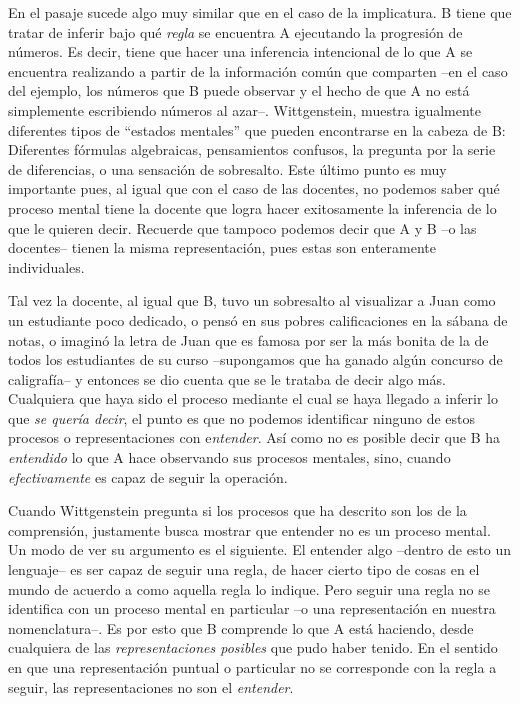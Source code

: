 \documentclass[]{book}
\begin{document}
En el pasaje sucede algo muy similar que en el caso de la implicatura. B
tiene que tratar de inferir bajo qué \emph{regla} se encuentra A
ejecutando la progresión de números. Es decir, tiene que hacer una
inferencia intencional de lo que A se encuentra realizando a partir de
la información común que comparten --en el caso del ejemplo, los números
que B puede observar y el hecho de que A no está simplemente escribiendo
números al azar--. Wittgenstein, muestra igualmente diferentes tipos de
``estados mentales'' que pueden encontrarse en la cabeza de B:
Diferentes fórmulas algebraicas, pensamientos confusos, la pregunta por
la serie de diferencias, o una sensación de sobresalto. Este último
punto es muy importante pues, al igual que con el caso de las docentes,
no podemos saber qué proceso mental tiene la docente que logra hacer
exitosamente la inferencia de lo que le quieren decir. Recuerde que
tampoco podemos decir que A y B --o las docentes-- tienen la misma
representación, pues estas son enteramente individuales.

Tal vez la docente, al igual que B, tuvo un sobresalto al visualizar a
Juan como un estudiante poco dedicado, o pensó en sus pobres
calificaciones en la sábana de notas, o imaginó la letra de Juan que es
famosa por ser la más bonita de la de todos los estudiantes de su curso
--supongamos que ha ganado algún concurso de caligrafía-- y entonces se
dio cuenta que se le trataba de decir algo más. Cualquiera que haya sido
el proceso mediante el cual se haya llegado a inferir lo que \emph{se
quería decir}, el punto es que no podemos identificar ninguno de estos
procesos o representaciones con e\emph{ntender}. Así como no es posible
decir que B ha \emph{entendido} lo que A hace observando sus procesos
mentales, sino, cuando \emph{efectivamente} es capaz de seguir la
operación.

Cuando Wittgenstein pregunta si los procesos que ha descrito son los de
la comprensión, justamente busca mostrar que entender no es un proceso
mental. Un modo de ver su argumento es el siguiente. El entender algo
--dentro de esto un lenguaje-- es ser capaz de seguir una regla, de
hacer cierto tipo de cosas en el mundo de acuerdo a como aquella regla
lo indique. Pero seguir una regla no se identifica con un proceso mental
en particular --o una representación en nuestra nomenclatura--. Es por
esto que B comprende lo que A está haciendo, desde cualquiera de las
\emph{representaciones posibles} que pudo haber tenido. En el sentido en
que una representación puntual o particular no se corresponde con la
regla a seguir, las representaciones no son el \emph{entender}.
\end{document}
